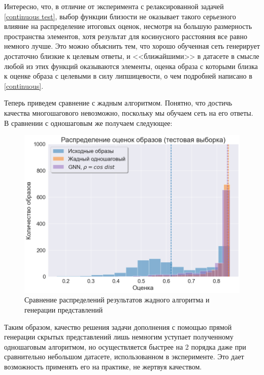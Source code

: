 \documentclass[a4paper,14pt]{extarticle}
\begin{document}
				Интересно, что, в отличие от эксперимента с релаксированной задачей \ref{continuous test}, выбор функции близости не оказывает такого серьезного влияние на распределение итоговых оценок, несмотря на большую размерность пространства элементов, хотя результат для косинусного расстояния все равно немного лучше. Это можно объяснить тем, что хорошо обученная сеть генерирует достаточно близкие к целевым ответы, и <<ближайшими>> в датасете в смысле любой из этих функций оказываются элементы, оценка образа с которыми близка к оценке образа с целевыми в силу липшицевости, о чем подробней написано в \ref{continuous}. 
				
				Теперь приведем сравнение с жадным алгоритмом. Понятно, что достичь качества многошагового невозможно, поскольку мы обучаем сеть на его ответы. В сравнении с одношаговым же получаем следующее:
				
				\begin{figure}[h!]
					\centering
					\includegraphics[scale = 0.6]{../figures/GNN_at_least_5_subset1000_test_comparison.png}
					\caption{Сравнение распределений результатов жадного алгоритма и генерации представлений}
				\end{figure}
			\vspace{2.3cm}
									
				Таким образом, качество решения задачи дополнения с помощью прямой генерации скрытых представлений лишь немногим уступает полученному одношаговым алгоритмом, но осуществляется быстрее на 2 порядка даже при сравнительно небольшом датасете, использованном в эксперименте. Это дает возможность применять его на практике, не жертвуя качеством.
				
\end{document}
